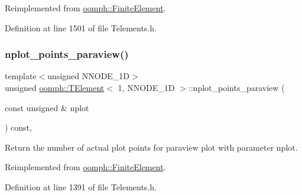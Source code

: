Reimplemented from \hyperlink{classoomph_1_1FiniteElement_a8ed563c7ff0cfd8bafdbb0132b388106}{oomph\+::\+Finite\+Element}.



Definition at line 1501 of file Telements.\+h.

\mbox{\label{classoomph_1_1TElement_3_011_00_01NNODE__1D_01_4_aff82173d3cd0a85383eb4765f79b7d3b}} 
\subsubsection{\texorpdfstring{nplot\+\_\+points\+\_\+paraview()}{nplot\_points\_paraview()}}
{\footnotesize\ttfamily template$<$unsigned N\+N\+O\+D\+E\+\_\+1D$>$ \\
unsigned \hyperlink{classoomph_1_1TElement}{oomph\+::\+T\+Element}$<$ 1, N\+N\+O\+D\+E\+\_\+1D $>$\+::nplot\+\_\+points\+\_\+paraview (\begin{DoxyParamCaption}\item[{const unsigned \&}]{nplot }\end{DoxyParamCaption}) const\hspace{0.3cm}{\ttfamily [inline]}, {\ttfamily [virtual]}}



Return the number of actual plot points for paraview plot with parameter nplot. 



Reimplemented from \hyperlink{classoomph_1_1FiniteElement_a06d32c85753a1e302c3b345ea27f6c85}{oomph\+::\+Finite\+Element}.



Definition at line 1391 of file Telements.\+h.

\mbox{\label{classoomph_1_1TElement_3_011_00_01NNODE__1D_01_4_a91b9dbef695e8e7aecbdaacc5b95d0a4}} 
